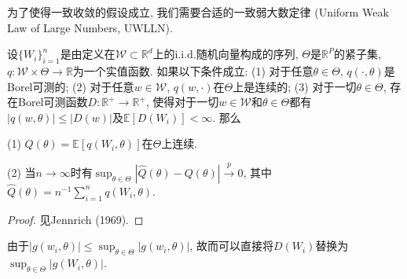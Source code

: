\documentclass[cn, 12pt, math=mtpro2, bibstyle=apa, blue, twocol]{elegantbook}
\newcommand{\R}{\mathbb{R}}
\newcommand{\E}{\mathbb{E}}
\begin{document}
为了使得一致收敛的假设成立, 我们需要合适的一致弱大数定律 (Uniform Weak Law of Large Numbers, UWLLN).
\begin{lemma}[一致弱大数定律]\label{lem:lem7.1}
  设$\{W_i\}_{i=1}^n$是由定义在$\mathscr{W}\subset\R^d$上的i.i.d.随机向量构成的序列, $\Theta$是$\R^P$的紧子集, $q:\mathscr{W}\times\Theta\to\R$为一个实值函数. 如果以下条件成立: (1) 对于任意$\theta\in\Theta$, $q(\cdot,\theta)$是Borel可测的; (2) 对于任意$w\in\mathscr{W}$, $q(w,\cdot)$在$\Theta$上是连续的; (3) 对于一切$\theta\in\Theta$, 存在Borel可测函数$D:\R^+\to\R^+$, 使得对于一切$w\in\mathscr{W}$和$\theta\in\Theta$都有$|q(w,\theta)|\leq |D(w)|$及$\E[D(W_i)]<\infty$. 那么

  (1) $Q(\theta)=\E[q(W_i,\theta)]$在$\Theta$上连续.

  (2) 当$n\to\infty$时有$\sup_{\theta\in\Theta}|\hat{Q}(\theta)-Q(\theta)|\xrightarrow{p}0$, 其中$\hat{Q}(\theta)=n^{-1}\sum_{i=1}^{n}q(W_i,\theta)$.
\end{lemma}
\begin{proof}
  见Jennrich (1969).
\end{proof}
\begin{remark}
由于$|g(w_i,\theta)|\leq \sup_{\theta\in\Theta}|g(w_i,\theta)|$, 故而可以直接将$D(W_i)$替换为$\sup_{\theta\in\Theta}|g(W_i,\theta)|$.
\end{remark}
\end{document}
